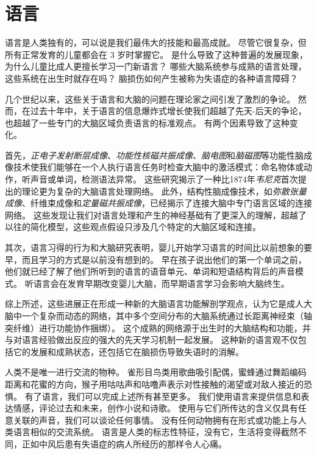 \chapter{语言} \label{chap:chap55}

语言是人类独有的，可以说是我们最伟大的技能和最高成就。
尽管它很复杂，但所有正常发育的儿童都会在 3 岁时掌握它。
是什么导致了这种普遍的发展现象，为什么儿童比成人更擅长学习一门新语言？
哪些大脑系统参与成熟的语言处理，这些系统在出生时就存在吗？
脑损伤如何产生被称为失语症的各种语言障碍？


几个世纪以来，这些关于语言和大脑的问题在理论家之间引发了激烈的争论。
然而，在过去十年中，关于语言的信息爆炸式增长使我们超越了先天-后天的争论，也超越了一些专门的大脑区域负责语言的标准观点。
有两个因素导致了这种变化。


首先，\textit{正电子发射断层成像}、\textit{功能性核磁共振成像}、\textit{脑电图}和\textit{脑磁图}等功能性脑成像技术使我们能够在一个人执行语言任务时检查大脑中的激活模式：命名物体或动作，听声音或单词，检测语法异常。
这些研究揭示了一种比1874年\textit{韦尼克}首次提出的理论更为复杂的大脑语言处理网络。
此外，结构性脑成像技术，如\textit{弥散张量成像}、纤维束成像和\textit{定量磁共振成像}，已经揭示了连接大脑中专门语言区域的连接网络。
这些发现让我们对语言处理和产生的神经基础有了更深入的理解，超越了以往的简化模型，这些观点假设只涉及几个特定的大脑区域和连接。


其次，语言习得的行为和大脑研究表明，婴儿开始学习语言的时间比以前想象的要早，而且学习的方式是以前没有想到的。
早在孩子说出他们的第一个单词之前，他们就已经了解了他们所听到的语言的语音单元、单词和短语结构背后的声音模式。
听语言会在发育早期改变婴儿大脑，而早期语言学习会影响大脑终生。


综上所述，这些进展正在形成一种新的大脑语言功能解剖学观点，认为它是成人大脑中一个复杂而动态的网络，其中多个空间分布的大脑系统通过长距离神经束（轴突纤维）进行功能协作捆绑）。
这个成熟的网络源于出生时的大脑结构和功能，并与对语言经验做出反应的强大的先天学习机制一起发展。
这种新的语言观不仅包括它的发展和成熟状态，还包括它在脑损伤导致失语时的消解。


人类不是唯一进行交流的物种。
雀形目鸟类用歌曲吸引配偶，蜜蜂通过舞蹈编码距离和花蜜的方向，猴子用咕咕声和咕噜声表示对性接触的渴望或对敌人接近的恐惧。
有了语言，我们可以完成上述所有甚至更多。
我们使用语言来提供信息和表达情感，评论过去和未来，创作小说和诗歌。
使用与它们所传达的含义仅具有任意关联的声音，我们可以谈论任何事情。
没有任何动物拥有在形式或功能上与人类语言相似的交流系统。
语言是人类的标志性特征，没有它，生活将变得截然不同，正如中风后患有失语症的病人所经历的那样令人心痛。



